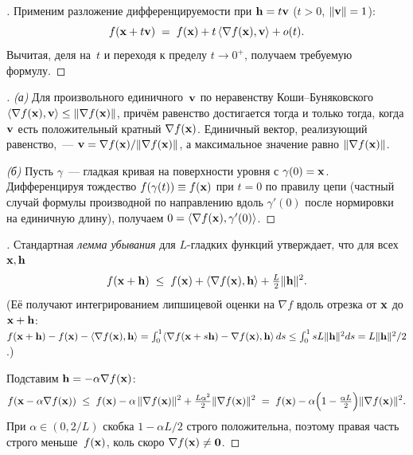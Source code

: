 \begin{proof}[]
Применим разложение дифференцируемости при $\mathbf{h} = t\mathbf{v}$
($t > 0$, $\|\mathbf{v}\| = 1$):
\[
  f(\mathbf{x} + t\mathbf{v}) \;=\; f(\mathbf{x}) + t\, \langle \nabla f(\mathbf{x}), \mathbf{v} \rangle + o(t).
\]
Вычитая, деля на~$t$ и переходя к пределу $t \to 0^{+}$, получаем
требуемую формулу.
\end{proof}

\begin{proof}[]
\emph{(а)} Для произвольного единичного~$\mathbf{v}$ по неравенству
Коши--Буняковского
$\langle \nabla f(\mathbf{x}), \mathbf{v} \rangle \le \|\nabla f(\mathbf{x})\|$,
причём равенство достигается тогда и только тогда, когда $\mathbf{v}$
есть положительный кратный $\nabla f(\mathbf{x})$. Единичный вектор,
реализующий равенство,~---
$\mathbf{v} = \nabla f(\mathbf{x}) / \|\nabla f(\mathbf{x})\|$, а
максимальное значение равно $\|\nabla f(\mathbf{x})\|$.

\emph{(б)} Пусть $\gamma$~--- гладкая кривая на поверхности уровня с
$\gamma(0) = \mathbf{x}$. Дифференцируя тождество
$f(\gamma(t)) \equiv f(\mathbf{x})$ при $t = 0$ по правилу цепи
(частный случай формулы производной по направлению вдоль $\gamma'(0)$
после нормировки на единичную длину), получаем
$0 = \langle \nabla f(\mathbf{x}), \gamma'(0) \rangle$.
\end{proof}

\begin{proof}[]
Стандартная \emph{лемма убывания} для $L$-гладких функций утверждает,
что для всех $\mathbf{x}, \mathbf{h}$
\[
  f(\mathbf{x} + \mathbf{h}) \;\le\; f(\mathbf{x}) + \langle \nabla f(\mathbf{x}), \mathbf{h} \rangle + \tfrac{L}{2}\|\mathbf{h}\|^2.
\]
(Её получают интегрированием липшицевой оценки на $\nabla f$ вдоль
отрезка от $\mathbf{x}$ до $\mathbf{x} + \mathbf{h}$:
$f(\mathbf{x} + \mathbf{h}) - f(\mathbf{x}) - \langle \nabla f(\mathbf{x}), \mathbf{h} \rangle = \int_0^1 \langle \nabla f(\mathbf{x} + s\mathbf{h}) - \nabla f(\mathbf{x}), \mathbf{h}\rangle\,ds \le \int_0^1 sL\|\mathbf{h}\|^2 ds = L\|\mathbf{h}\|^2/2$.)

Подставим $\mathbf{h} = -\alpha \nabla f(\mathbf{x})$:
\[
  f(\mathbf{x} - \alpha \nabla f(\mathbf{x}))
  \;\le\; f(\mathbf{x}) - \alpha\,\|\nabla f(\mathbf{x})\|^2 + \tfrac{L \alpha^2}{2}\|\nabla f(\mathbf{x})\|^2
  \;=\; f(\mathbf{x}) - \alpha\Bigl(1 - \tfrac{\alpha L}{2}\Bigr) \|\nabla f(\mathbf{x})\|^2.
\]
При $\alpha \in (0, 2/L)$ скобка $1 - \alpha L / 2$ строго
положительна, поэтому правая часть строго меньше~$f(\mathbf{x})$,
коль скоро $\nabla f(\mathbf{x}) \neq \mathbf{0}$.
\end{proof}

